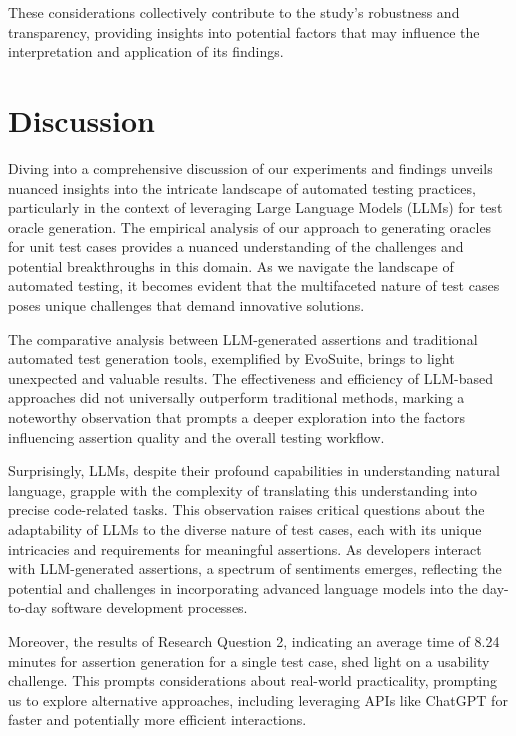 These considerations collectively contribute to the study's robustness and transparency, providing insights into potential factors that may influence the interpretation and application of its findings.

\section{Discussion}
\label{sec:discussion}
\vspace{0.2 cm}

Diving into a comprehensive discussion of our experiments and findings unveils nuanced insights into the intricate landscape of automated testing practices, particularly in the context of leveraging Large Language Models (LLMs) for test oracle generation. The empirical analysis of our approach to generating oracles for unit test cases provides a nuanced understanding of the challenges and potential breakthroughs in this domain. As we navigate the landscape of automated testing, it becomes evident that the multifaceted nature of test cases poses unique challenges that demand innovative solutions.

The comparative analysis between LLM-generated assertions and traditional automated test generation tools, exemplified by EvoSuite, brings to light unexpected and valuable results. The effectiveness and efficiency of LLM-based approaches did not universally outperform traditional methods, marking a noteworthy observation that prompts a deeper exploration into the factors influencing assertion quality and the overall testing workflow.

Surprisingly, LLMs, despite their profound capabilities in understanding natural language, grapple with the complexity of translating this understanding into precise code-related tasks. This observation raises critical questions about the adaptability of LLMs to the diverse nature of test cases, each with its unique intricacies and requirements for meaningful assertions. As developers interact with LLM-generated assertions, a spectrum of sentiments emerges, reflecting the potential and challenges in incorporating advanced language models into the day-to-day software development processes.

Moreover, the results of Research Question 2, indicating an average time of 8.24 minutes for assertion generation for a single test case, shed light on a usability challenge. This prompts considerations about real-world practicality, prompting us to explore alternative approaches, including leveraging APIs like ChatGPT for faster and potentially more efficient interactions.

